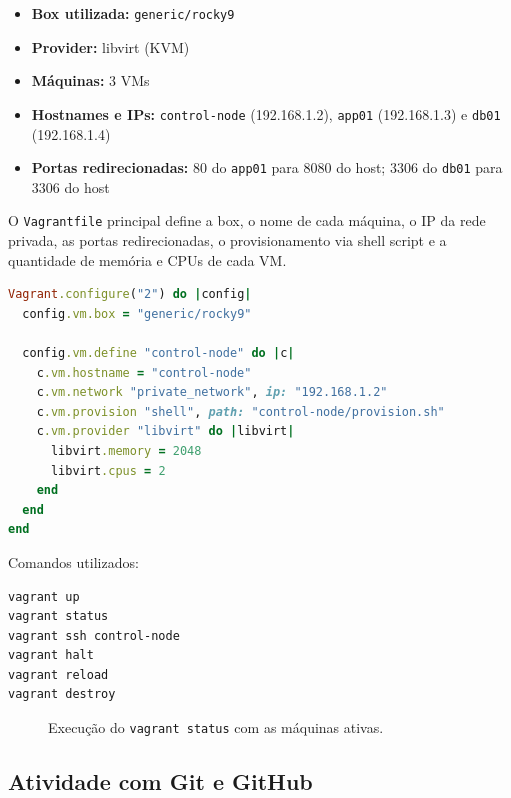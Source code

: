 \documentclass[12pt,a4paper]{article}
\begin{document}
\begin{itemize}
  \item \textbf{Box utilizada:} \texttt{generic/rocky9}
  \item \textbf{Provider:} libvirt (KVM)
  \item \textbf{M\'aquinas:} 3 VMs
  \item \textbf{Hostnames e IPs:} \texttt{control-node} (192.168.1.2),
        \texttt{app01} (192.168.1.3) e \texttt{db01} (192.168.1.4)
  \item \textbf{Portas redirecionadas:} 80 do \texttt{app01} para 8080 do host;
        3306 do \texttt{db01} para 3306 do host
\end{itemize}

O \texttt{Vagrantfile} principal define a box, o nome de cada m\'aquina, o IP da
rede privada, as portas redirecionadas, o provisionamento via shell script e a
quantidade de mem\'oria e CPUs de cada VM.

\begin{lstlisting}[language=Ruby,caption={Trecho do Vagrantfile}]
Vagrant.configure("2") do |config|
  config.vm.box = "generic/rocky9"

  config.vm.define "control-node" do |c|
    c.vm.hostname = "control-node"
    c.vm.network "private_network", ip: "192.168.1.2"
    c.vm.provision "shell", path: "control-node/provision.sh"
    c.vm.provider "libvirt" do |libvirt|
      libvirt.memory = 2048
      libvirt.cpus = 2
    end
  end
end
\end{lstlisting}

Comandos utilizados:

\begin{lstlisting}[language=bash,caption={Comandos do Vagrant}]
vagrant up
vagrant status
vagrant ssh control-node
vagrant halt
vagrant reload
vagrant destroy
\end{lstlisting}

\begin{figure}[htbp]
  \centering
  \caption{Execu\c{c}\~ao do \texttt{vagrant status} com as m\'aquinas ativas.}
\end{figure}

\subsection{Atividade com Git e GitHub}
\end{document}
